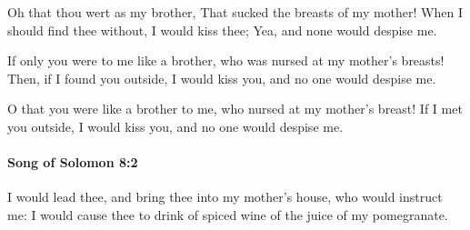 			\begin{versebox}
					\item[BHS] 
					\item[LXX] 
					\item[ASV] Oh that thou wert as my brother, That sucked the breasts of my mother! When I should find thee without, I would kiss thee; Yea, and none would despise me.
					\item[NIV] If only you were to me like a brother, who was nursed at my mother’s breasts! Then, if I found you outside, I would kiss you, and no one would despise me.
					\item[NRSV] O that you were like a brother to me, who nursed at my mother’s breast! If I met you outside, I would kiss you, and no one would despise me.
			\end{versebox}

		\paragraph{Song of Solomon 8:2} %
			\label{SONGOFSOLOMON-8-2}

			I would lead thee, and bring thee into my mother’s house, who would instruct me: I would cause thee to drink of spiced wine of the juice of my pomegranate.

